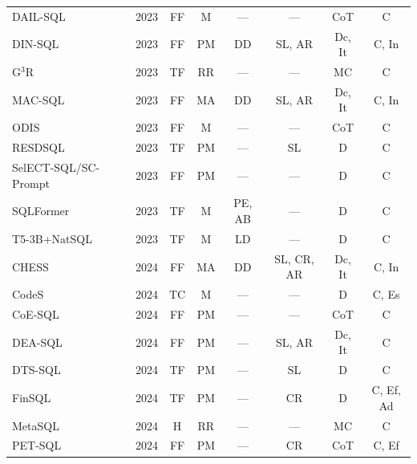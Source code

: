 {\begin{longtable}{@{}llcccccc@{}}
DAIL-SQL~\cite{DAIL-SQL2023}            & 2023 & FF         & M       & ---     & ---       & CoT     & C       \\
DIN-SQL~\cite{DIN-SQL2023}              & 2023 & FF         & PM      & DD      & SL, AR    & Dc, It  & C, In   \\
G$^{3}$R~\cite{G3R2023}                 & 2023 & TF         & RR      & ---     & ---       & MC      & C       \\
MAC-SQL~\cite{MAC-SQL2023}              & 2023 & FF         & MA      & DD      & SL, AR    & Dc, It  & C, In   \\
ODIS~\cite{ODIS2023}                    & 2023 & FF         & M       & ---     & ---       & CoT     & C       \\
RESDSQL~\cite{RESDSQL2023}              & 2023 & TF         & PM      & ---     & SL        & D       & C       \\
SelECT-SQL/SC-Prompt~\cite{SC-Prompt2023} & 2023 & FF       & PM      & ---     & ---       & D       & C       \\
SQLFormer~\cite{SQLFormer2023}          & 2023 & TF         & M       & PE, AB  & ---       & D       & C       \\
T5-3B+NatSQL~\cite{T5-3B+NatSQL+TokenPreprocessing2023} & 2023 & TF & M & LD & ---  & D       & C       \\
CHESS~\cite{CHESS2024}                  & 2024 & FF         & MA      & DD      & SL, CR, AR & Dc, It & C, In   \\
CodeS~\cite{CodeS2024}                  & 2024 & TC         & M       & ---     & ---       & D       & C, Es   \\
CoE-SQL~\cite{CoE-SQL2024}              & 2024 & FF         & PM      & ---     & ---       & CoT     & C       \\
DEA-SQL~\cite{DEA-SQL2024}              & 2024 & FF         & PM      & ---     & SL, AR    & Dc, It  & C       \\
DTS-SQL~\cite{DTS-SQL2024}              & 2024 & TF         & PM      & ---     & SL        & D       & C       \\
FinSQL~\cite{FinSQL2024}                & 2024 & TF         & PM      & ---     & CR        & D       & C, Ef, Ad \\
MetaSQL~\cite{MetaSQL2024}              & 2024 & H          & RR      & ---     & ---       & MC      & C       \\
PET-SQL~\cite{PET-SQL2024}              & 2024 & FF         & PM      & ---     & CR        & CoT     & C, Ef   \\

\end{longtable}}
